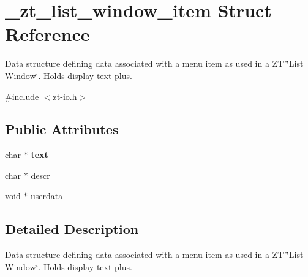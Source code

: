 \hypertarget{struct__zt__list__window__item}{\section{\-\_\-zt\-\_\-list\-\_\-window\-\_\-item Struct Reference}
\label{struct__zt__list__window__item}
}


Data structure defining data associated with a menu item as used in a Z\-T \char`\"{}\-List Window\char`\"{}. Holds display text plus.  




{\ttfamily \#include $<$zt-\/io.\-h$>$}

\subsection*{Public Attributes}
\begin{DoxyCompactItemize}
\item 
\hypertarget{struct__zt__list__window__item_ad4c616133f9af78600ac79aeefd82cf4}{char $\ast$ {\bfseries text}}\label{struct__zt__list__window__item_ad4c616133f9af78600ac79aeefd82cf4}

\item 
char $\ast$ \hyperlink{struct__zt__list__window__item_afd12505b917bdc36aea5f57cbcda905f}{descr}
\item 
void $\ast$ \hyperlink{struct__zt__list__window__item_a3413a3b8542a17b9f7194a504f96f600}{userdata}
\end{DoxyCompactItemize}


\subsection{Detailed Description}
Data structure defining data associated with a menu item as used in a Z\-T \char`\"{}\-List Window\char`\"{}. Holds display text plus. 


